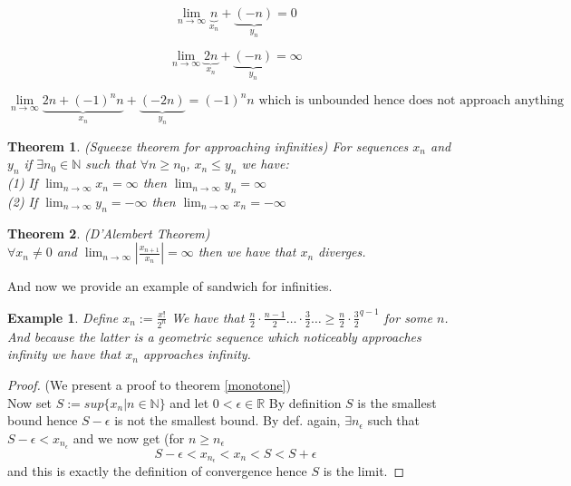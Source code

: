 \documentclass{article}
\newtheorem{theorem}{Theorem}[section]
\numberwithin{equation}{subsection}
\newtheorem{example}{Example}[section]
\begin{document}
$$ \lim_{n\to\infty}\underbrace{n}_{x_{n}} + \underbrace{(-n)}_{y_{n}} = 0 $$

$$\lim_{n\to\infty}\underbrace{2n}_{x_{n}} + \underbrace{(-n)}_{y_{n}} = \infty$$

$$\lim_{n\to\infty}\underbrace{2n + (-1)^{n}n}_{x_{n}} + \underbrace{(-2n)}_{y_{n}} = (-1)^{n}n \text{ which is unbounded hence does not approach anything}$$


\begin{theorem}(Squeeze theorem for approaching infinities)
For sequences $x_{n}$ and $y_{n}$ if $\exists n_{0} \in \mathbb{N}$ such that $\forall n \geq n_{0}$, $x_{n} \leq y_{n}$ we have:
\\
(1) If $\lim_{n\to\infty}{x_{n}} = \infty$ then $\lim_{n\to\infty}{y_{n}} = \infty$
\\
(2) If $\lim_{n\to\infty}{y_{n}} = -\infty$ then $\lim_{n\to\infty}{x_{n}} = -\infty$
\end{theorem}

\begin{theorem}(D'Alembert Theorem)
\\
$\forall x_{n} \not = 0$ and $\lim_{n\to \infty}{|\frac{x_{n+1}}{x_{n}}|} = \infty$ then we have that $x_{n}$ diverges. 
\end{theorem}

And now we provide an example of sandwich for infinities. 

\begin{example}
Define $x_{n}:= \frac{x!}{2^{n}}$ We have that $\frac{n}{2} \cdot \frac{n-1}{2} \ldots \cdot \frac{3}{2} \ldots \geq \frac{n}{2} \cdot \frac{3}{2}^{q-1}$ for some $n$. And because the latter is a geometric sequence which noticeably approaches infinity we have that $x_{n}$ approaches infinity. 
\end{example}

\begin{proof}(We present a proof to theorem \ref{monotone})
\\
Now set $S:=sup\{x_{n}|n\in\mathbb{N}\}$ and let $0<\epsilon\in\mathbb{R}$ By definition $S$ is the smallest bound hence $S-\epsilon$ is not the smallest bound. By def. again, $\exists n_{\epsilon}$ such that $S-\epsilon<x_{n_{\epsilon}}$ and we now get (for $n\geq n_{\epsilon}$ 
$$S - \epsilon < x_{n_{\epsilon}} < x_{n} < S < S+\epsilon$$ and this is exactly the definition of convergence hence $S$ is the limit.
\end{proof}
\clearpage
\end{document}
